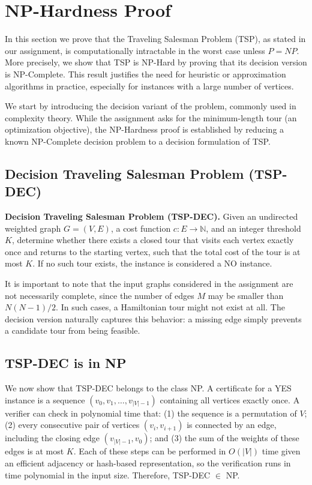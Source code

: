 \section{NP-Hardness Proof}
\label{sec:np_hard}

In this section we prove that the Traveling Salesman Problem (TSP), as stated in our assignment, is computationally intractable in the worst case unless $P = NP$. More precisely, we show that TSP is NP-Hard by proving that its decision version is NP-Complete. This result justifies the need for heuristic or approximation algorithms in practice, especially for instances with a large number of vertices.

We start by introducing the decision variant of the problem, commonly used in complexity theory. While the assignment asks for the minimum-length tour (an optimization objective), the NP-Hardness proof is established by reducing a known NP-Complete decision problem to a decision formulation of TSP.

\subsection{Decision Traveling Salesman Problem (TSP-DEC)}

\textbf{Decision Traveling Salesman Problem (TSP-DEC).} Given an undirected weighted graph $G = (V, E)$, a cost function $c : E \to \mathbb{N}$, and an integer threshold $K$, determine whether there exists a closed tour that visits each vertex exactly once and returns to the starting vertex, such that the total cost of the tour is at most $K$. If no such tour exists, the instance is considered a NO instance.

It is important to note that the input graphs considered in the assignment are not necessarily complete, since the number of edges $M$ may be smaller than $N(N-1)/2$. In such cases, a Hamiltonian tour might not exist at all. The decision version naturally captures this behavior: a missing edge simply prevents a candidate tour from being feasible.

\subsection{TSP-DEC is in NP}

We now show that TSP-DEC belongs to the class NP. A certificate for a YES instance is a sequence $(v_0, v_1, \ldots, v_{|V|-1})$ containing all vertices exactly once. A verifier can check in polynomial time that: (1) the sequence is a permutation of $V$; (2) every consecutive pair of vertices $(v_i, v_{i+1})$ is connected by an edge, including the closing edge $(v_{|V|-1}, v_0)$; and (3) the sum of the weights of these edges is at most $K$. Each of these steps can be performed in $O(|V|)$ time given an efficient adjacency or hash-based representation, so the verification runs in time polynomial in the input size. Therefore, TSP-DEC $\in$ NP.

